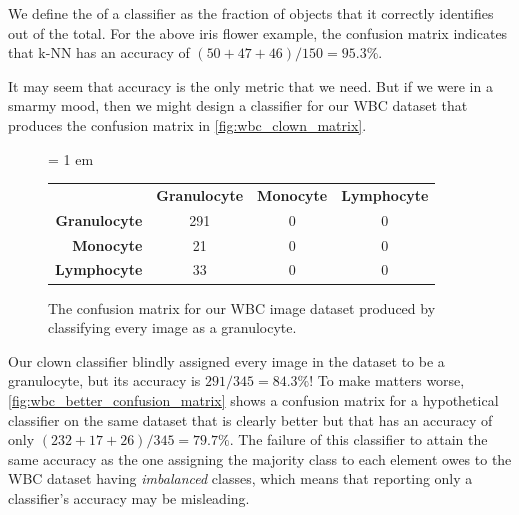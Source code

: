 \begin{note}\end{note}

We define the  of a classifier as the fraction of objects that it correctly identifies out of the total. For the above iris flower example, the confusion matrix indicates that k-NN has an accuracy of $(50 + 47 + 46)/150 = 95.3\%$.

It may seem that accuracy is the only metric that we need. But if we were in a smarmy mood, then we might design a classifier for our WBC dataset that produces the confusion matrix in \autoref{fig:wbc_clown_matrix}.\\

\begin{figure}[h]
\centering
\tabcolsep = 1 em
\mySfFamily
{}
\begin{tabular}{r c c c}
\rowcolor{gray!50}
& \textbf{Granulocyte} & \textbf{Monocyte} & \textbf{Lymphocyte} \\
\textbf{Granulocyte} & 291 & 0 & 0 \\
\textbf{Monocyte} & \phantom{5}21 & 0 & 0 \\
\textbf{Lymphocyte} & \phantom{5}33 & 0 & 0
\end{tabular}
\caption{The confusion matrix for our WBC image dataset produced by classifying every image as a granulocyte.}
\label{fig:wbc_clown_matrix}
\end{figure}

\begin{qbox}\end{qbox}

Our clown classifier blindly assigned every image in the dataset to be a granulocyte, but its accuracy is $291/345 = 84.3\%$! To make matters worse, \autoref{fig:wbc_better_confusion_matrix} shows a confusion matrix for a hypothetical classifier on the same dataset that is clearly better but that has an accuracy of only $(232 + 17 + 26)/345 = 79.7\%$. The failure of this classifier to attain the same accuracy as the one assigning the majority class to each element owes to the WBC dataset having \textit{imbalanced} classes, which means that reporting only a classifier's accuracy may be misleading.\\


